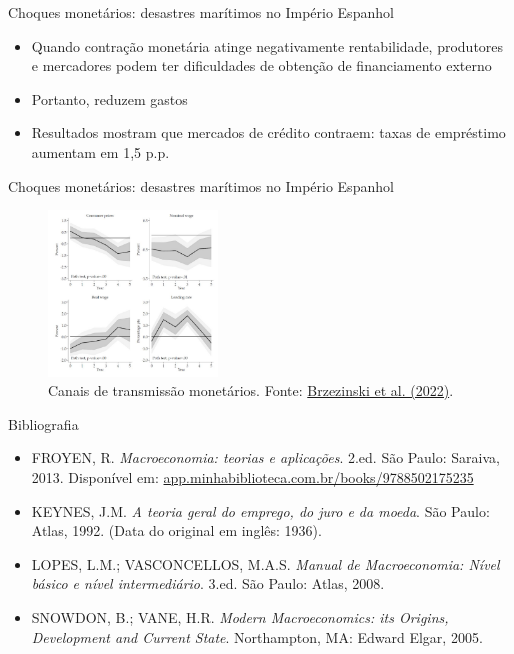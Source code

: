 \documentclass[10pt]{beamer}
\begin{document}
\begin{frame}
    {Choques monetários: desastres marítimos no Império Espanhol}
    \begin{itemize}
        \item Quando contração monetária atinge negativamente rentabilidade, produtores e mercadores podem ter dificuldades de obtenção de financiamento externo\bigskip
        \item Portanto, reduzem gastos\bigskip
        \item Resultados mostram que mercados de crédito contraem: taxas de empréstimo aumentam em 1,5 p.p.
    \end{itemize}
\end{frame}

\begin{frame}
    {Choques monetários: desastres marítimos no Império Espanhol}
    \begin{figure}
        \centering
        \includegraphics[width=0.4\textwidth]{./figures/aula3_fig8}
        \caption{Canais de transmissão monetários. Fonte: \href{https://cepr.org/publications/dp14089}{Brzezinski et al. (2022)}.}
        \label{aula3_fig8}
    \end{figure}
\end{frame}

\begin{frame}{ Bibliografia}
    \begin{itemize}
        \item FROYEN, R. \emph{Macroeconomia: teorias e aplicações}. 2.ed. São Paulo: Saraiva, 2013. Disponível em: \href{https://app.minhabiblioteca.com.br/books/9788502175235}{app.minhabiblioteca.com.br/books/9788502175235}\medskip
        \item KEYNES, J.M. \emph{A teoria geral do emprego, do juro e da moeda}. São Paulo: Atlas, 1992. (Data do original em inglês: 1936).\medskip
        \item LOPES, L.M.; VASCONCELLOS, M.A.S. \emph{Manual de Macroeconomia: Nível básico e nível intermediário}. 3.ed. São Paulo: Atlas, 2008.\medskip
        \item SNOWDON, B.; VANE, H.R. \emph{Modern Macroeconomics: its Origins, Development and Current State}. Northampton, MA: Edward Elgar, 2005.
    \end{itemize}
\end{frame}
\end{document}

